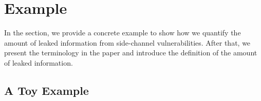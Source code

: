 \section{Example}
In the section, we provide a concrete example to show how we 
quantify the amount of leaked information from side-channel
vulnerabilities. After that, we present the terminology in the
paper and introduce the definition of the amount of 
leaked information.
\subsection{A Toy Example}
